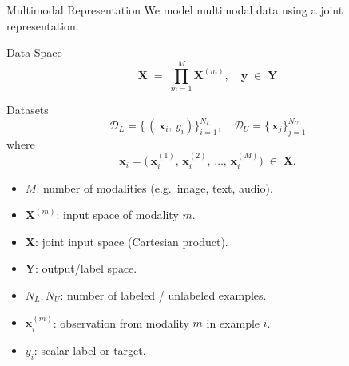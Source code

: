 \documentclass[spanish, aspectratio=169]{beamer}
\begin{document}
\begin{frame}{Multimodal Representation}
	We model multimodal data using a joint representation.
	
	\begin{block}{Data Space}
		\[
		\mathbf{X} \;=\; \prod_{m=1}^{M} \mathbf{X}^{(m)},
		\quad
		\mathbf{y} \;\in\; \mathbf{Y}
		\]
	\end{block}
	
	\begin{block}{Datasets}
		\[
		\mathcal{D}_{L} = \bigl\{\,(\,\mathbf{x}_{i},\,y_{i})\bigr\}_{i=1}^{N_{L}},
		\quad
		\mathcal{D}_{U} = \bigl\{\,\mathbf{x}_{j}\bigr\}_{j=1}^{N_{U}}
		\]
		where
		\[
		\mathbf{x}_{i}
		= \bigl(\,\mathbf{x}_{i}^{(1)},\,\mathbf{x}_{i}^{(2)},\,\dots,\,\mathbf{x}_{i}^{(M)}\bigr)
		\;\in\;\mathbf{X}.
		\]
	\end{block}
	
		\begin{itemize}
			\item $M$: number of modalities (e.g.\ image, text, audio).
			\item $\mathbf{X}^{(m)}$: input space of modality $m$.
			\item $\mathbf{X}$: joint input space (Cartesian product).
			\item $\mathbf{Y}$: output/label space.
			\item $N_{L}, N_{U}$: number of labeled / unlabeled examples.
			\item $\mathbf{x}_{i}^{(m)}$: observation from modality $m$ in example $i$.
			\item $y_{i}$: scalar label or target.
		\end{itemize}
\end{frame}
\end{document}
